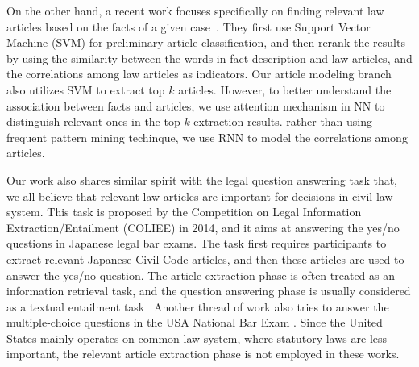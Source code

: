 
On the other hand, a recent work focuses specifically on finding relevant law articles based on the facts of a given case~\cite{liu2015predicting}.
They first use Support Vector Machine (SVM) for preliminary article classification, and then 
rerank the results by using the similarity between the words in fact description and law articles, and the correlations among law articles as indicators.
Our article modeling branch also utilizes SVM to extract top $k$ articles. However, to better understand the association between facts and articles, we use attention mechanism in NN to distinguish relevant ones in the top $k$ extraction results.  rather than using frequent pattern mining techinque, we use RNN to model the correlations among articles.


Our work also shares similar spirit with the legal question answering task that, we all believe that relevant law articles are important for decisions in civil law system. This task is proposed by the Competition on Legal Information Extraction/Entailment (COLIEE) in 2014,
and it aims at answering the yes/no questions in Japanese legal bar exams. The task first requires participants to extract relevant Japanese Civil Code articles, and then these articles are used to answer the yes/no question. 
The article extraction phase is often treated as an information retrieval task, and the question answering phase is usually considered as a textual entailment task~\cite{kim2014legal,kimconvolutional}
Another thread of work also tries to answer the multiple-choice questions in the USA National Bar Exam \cite{FAWEI16,adebayoneural}. Since the United States mainly operates on common law system, where statutory laws are less important, the relevant article extraction phase is not employed in these works.